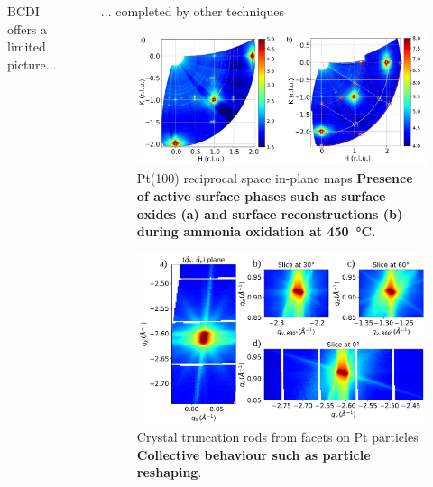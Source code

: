 \documentclass[final]{beamer}
\newlength{\sepwidth}
\newlength{\colwidth}
\newcommand{\separatorcolumn}{\begin{column}{\sepwidth}\end{column}}
\begin{document}
\begin{frame}[t]
\begin{columns}[t]
\begin{column}{\colwidth}
\begin{block}{BCDI offers a limited picture...}
        
    \end{block}
\end{column}

\separatorcolumn

\begin{column}{\colwidth}

    \begin{exampleblock}{... completed by other techniques}


        \begin{figure}
            \centering
            \includegraphics[width=0.95\colwidth]{Figures/Maps.pdf}
            \caption{Pt(100) reciprocal space in-plane maps \textrightarrow \textbf{Presence of active surface phases such as surface oxides (a) and surface reconstructions (b) during ammonia oxidation at \qty{450}{\degreeCelsius}}.}
            \label{fig:Pt100SurfRec}
        \end{figure}

        \begin{figure}
            \centering
            \includegraphics[page=1, width=0.95\colwidth]{Figures/FacetsTogether.pdf}
            \caption{Crystal truncation rods from facets on Pt particles \rightarrow \textbf{Collective behaviour such as particle reshaping}.}
        \end{figure}


\end{exampleblock}
\end{column}
\end{columns}
\end{frame}
\end{document}
